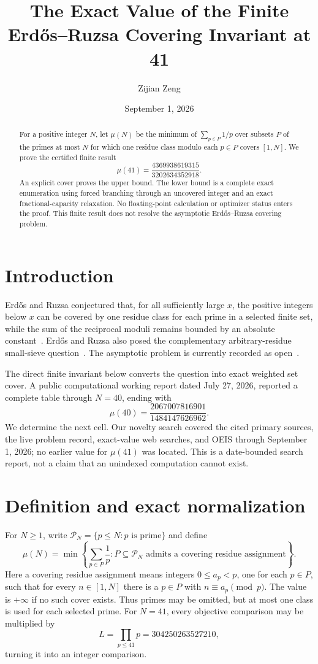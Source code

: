 \documentclass[11pt]{amsart}
\title[The finite covering invariant at 41]{The Exact Value of the Finite Erd\H{o}s--Ruzsa Covering Invariant at 41}
\author{Zijian Zeng}
\date{September 1, 2026}
\begin{document}
\begin{abstract}
For a positive integer $N$, let $\mu(N)$ be the minimum of
$\sum_{p\in P}1/p$ over subsets $P$ of the primes at most $N$ for which one
residue class modulo each $p\in P$ covers $[1,N]$.  We prove the certified
finite result
\[
 \mu(41)=\frac{4369938619315}{3202634352918}.
\]
An explicit cover proves the upper bound.  The lower bound is a complete exact
enumeration using forced branching through an uncovered integer and an exact
fractional-capacity relaxation.  No floating-point calculation or optimizer
status enters the proof.  This finite result does not resolve the asymptotic
Erd\H{o}s--Ruzsa covering problem.
\end{abstract}
\maketitle
\section{Introduction}
Erd\H{o}s and Ruzsa conjectured that, for all sufficiently large $x$, the positive integers
below $x$ can be covered by one residue class for each prime in a selected
finite set, while the sum of the reciprocal moduli remains bounded by an
absolute constant~\cite[p.~106]{Erdos1980}.  Erd\H{o}s and Ruzsa also posed the
complementary arbitrary-residue small-sieve question~\cite[p.~386, Problem~2]{ErdosRuzsa1980}.
The asymptotic problem is currently recorded as open~\cite{Bloom1200}.

The direct finite invariant below converts the question into exact weighted
set cover.  A public computational working report dated July 27, 2026,
reported a complete table through $N=40$, ending with~\cite{WorkingReport1200}
\[
\mu(40)=\frac{2067007816901}{1484147626962}.
\]
We determine the next cell.  Our novelty search covered the cited primary
sources, the live problem record, exact-value web searches, and OEIS through
September 1, 2026; no earlier value for $\mu(41)$ was located.  This is a
date-bounded search report, not a claim that an unindexed computation cannot
exist.

\section{Definition and exact normalization}
For $N\ge1$, write $\mathcal P_N=\{p\le N:p\text{ is prime}\}$ and define
\[
\mu(N)=\min\left\{\sum_{p\in P}\frac1p:P\subseteq\mathcal P_N
\text{ admits a covering residue assignment}\right\}.
\]
Here a covering residue assignment means integers $0\le a_p<p$, one for each
$p\in P$, such that for every $n\in[1,N]$ there is a $p\in P$ with
$n\equiv a_p\pmod p$.
The value is $+\infty$ if no such cover exists.  Thus primes may be omitted,
but at most one class is used for each selected prime.  For $N=41$, every
objective comparison may be multiplied by
\[
 L=\prod_{p\le41}p=304250263527210,
\]
turning it into an integer comparison.
\end{document}
